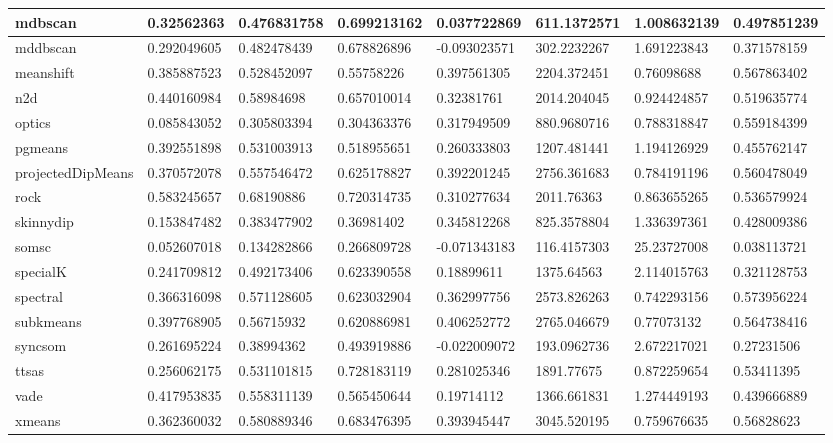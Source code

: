 \begin{table}[H]
\begin{tabular}{|l|l|l|l|l|l|l|l|}
\hline
mdbscan & 0.32562363 & 0.476831758 & 0.699213162 & 0.037722869 & 611.1372571 & 1.008632139 & 0.497851239 \\
\hline
mddbscan & 0.292049605 & 0.482478439 & 0.678826896 & -0.093023571 & 302.2232267 & 1.691223843 & 0.371578159 \\
\hline
meanshift & 0.385887523 & 0.528452097 & 0.55758226 & 0.397561305 & 2204.372451 & 0.76098688 & 0.567863402 \\
\hline
n2d & 0.440160984 & 0.58984698 & 0.657010014 & 0.32381761 & 2014.204045 & 0.924424857 & 0.519635774 \\
\hline
optics & 0.085843052 & 0.305803394 & 0.304363376 & 0.317949509 & 880.9680716 & 0.788318847 & 0.559184399 \\
\hline
pgmeans & 0.392551898 & 0.531003913 & 0.518955651 & 0.260333803 & 1207.481441 & 1.194126929 & 0.455762147 \\
\hline
projectedDipMeans & 0.370572078 & 0.557546472 & 0.625178827 & 0.392201245 & 2756.361683 & 0.784191196 & 0.560478049 \\
\hline
rock & 0.583245657 & 0.68190886 & 0.720314735 & 0.310277634 & 2011.76363 & 0.863655265 & 0.536579924 \\
\hline
skinnydip & 0.153847482 & 0.383477902 & 0.36981402 & 0.345812268 & 825.3578804 & 1.336397361 & 0.428009386 \\
\hline
somsc & 0.052607018 & 0.134282866 & 0.266809728 & -0.071343183 & 116.4157303 & 25.23727008 & 0.038113721 \\
\hline
specialK & 0.241709812 & 0.492173406 & 0.623390558 & 0.18899611 & 1375.64563 & 2.114015763 & 0.321128753 \\
\hline
spectral & 0.366316098 & 0.571128605 & 0.623032904 & 0.362997756 & 2573.826263 & 0.742293156 & 0.573956224 \\
\hline
subkmeans & 0.397768905 & 0.56715932 & 0.620886981 & 0.406252772 & 2765.046679 & 0.77073132 & 0.564738416 \\
\hline
syncsom & 0.261695224 & 0.38994362 & 0.493919886 & -0.022009072 & 193.0962736 & 2.672217021 & 0.27231506 \\
\hline
ttsas & 0.256062175 & 0.531101815 & 0.728183119 & 0.281025346 & 1891.77675 & 0.872259654 & 0.53411395 \\
\hline
vade & 0.417953835 & 0.558311139 & 0.565450644 & 0.19714112 & 1366.661831 & 1.274449193 & 0.439666889 \\
\hline
xmeans & 0.362360032 & 0.580889346 & 0.683476395 & 0.393945447 & 3045.520195 & 0.759676635 & 0.56828623 \\
\hline
\end{tabular}
\end{table}

